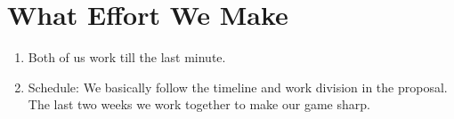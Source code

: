 \documentclass[annual]{acmsiggraph}
\begin{document}
\section{What Effort We Make}
\begin{enumerate}
\item{Both of us work till the last minute.}
\item{Schedule}: We basically follow the timeline and work division in the proposal. The last two weeks we work together to make our game sharp. 
\end{enumerate}

\nocite{*}


\end{document}

